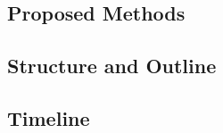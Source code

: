 


\subsection{Proposed Methods}








\subsection{Structure and Outline}


\subsection{Timeline}



